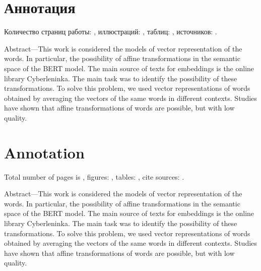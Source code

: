 \documentclass[a4paper,14pt]{article}
\begin{document}


\section*{Аннотация}

Количество страниц работы: \getlastpage, иллюстраций: \totalfigures, таблиц: \totaltables, источников: \LastBib.

Abstract—This work is considered the models of vector representation of the words. In particular, the possibility of affine transformations in the semantic space of the BERT model. The main source of texts for embeddings is the online library Cyberleninka. The main task was to identify the possibility of these transformations. To solve this problem, we used vector representations of words obtained by averaging the vectors of the same words in different contexts. Studies have shown that affine transformations of words are possible, but with low quality.


\section*{Annotation}

Total number of pages is \getlastpage, figures: \totalfigures, tables: \totaltables, cite sources: \LastBib.

Abstract—This work is considered the models of vector representation of the words. In particular, the possibility of affine transformations in the semantic space of the BERT model. The main source of texts for embeddings is the online library Cyberleninka. The main task was to identify the possibility of these transformations. To solve this problem, we used vector representations of words obtained by averaging the vectors of the same words in different contexts. Studies have shown that affine transformations of words are possible, but with low quality.
\end{document}
